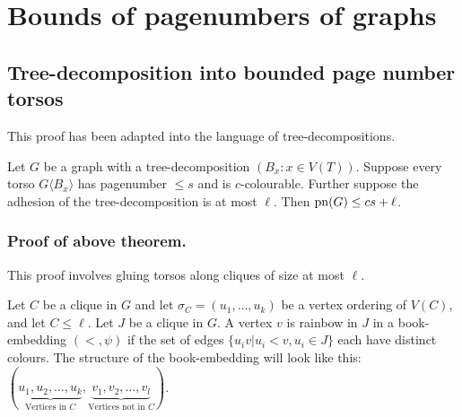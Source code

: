 \section{Bounds of pagenumbers of graphs}\label{sec:BoundedPagenumber}
\subsection{Tree-decomposition into bounded page number torsos}\label{ssec:Clique_sum_Pagenumber_bound}

This proof has been adapted into the language of tree-decompositions.
\begin{theorem}\label{thm:clique_sum_pagenumber_bound}
	Let \(G\) be a graph with a tree-decomposition \((B_x: x \in V(T))\). Suppose every torso \(G \langle B_x \rangle\) has pagenumber \(\leq s\) and is \(c\)-colourable. Further suppose the adhesion of the tree-decomposition is at most \(\ell\).
	Then \(\operatorname{pn}(G) \leq cs + \ell \).
\end{theorem}

\subsubsection{Proof of above theorem.}
This proof involves gluing torsos along cliques of size at most \( \ell \).

Let \(C\) be a clique in \(G\) and let \(\sigma_C = (u_1, \ldots , u_k)\) be a vertex ordering of \(V(C)\), and let \(C \leq \ell \). Let $J$ be a clique in $G$. A vertex $v$ is rainbow in $J$ in a book-embedding $(<, \psi)$ if the set of edges $\{u_i v | u_i < v, u_i \in J\}$ each have distinct colours. The structure of the book-embedding will look like this: \((\underbrace{u_1, u_2, \ldots, u_k}_{\text{Vertices in } C}, \underbrace{v_1, v_2, \ldots, v_l}_{\text{Vertices not in }C})\).

